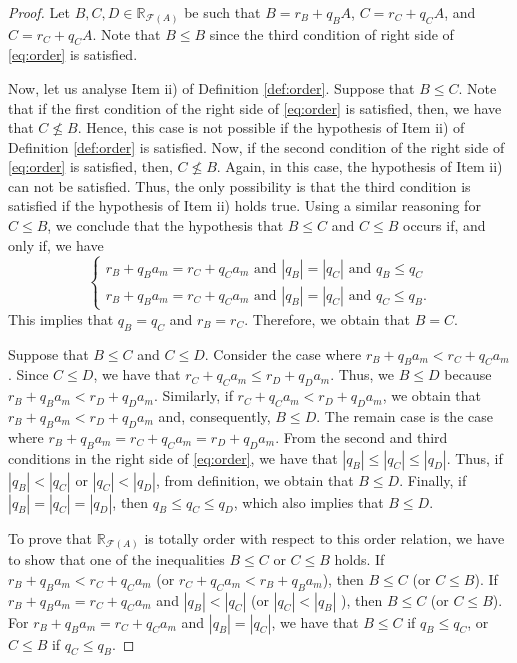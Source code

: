 \documentclass[12pt,a4paper]{article}
\newcommand{\RFA}{\mathbb{R}_{\mathcal{F}(A)}}
\begin{document}
\begin{proof}
Let $B,C,D \in \RFA$ be such that $B = r_B + q_BA$, $C = r_C + q_CA$, and $C = r_C + q_CA$. 
Note that $B \leq B$ since the third condition of right side of \eqref{eq:order} is satisfied. 

Now, let us analyse Item ii) of Definition \ref{def:order}. 
Suppose that  $B\leq C$. Note that if  the first condition of the right side of \eqref{eq:order} is satisfied, then, we have that $C \not\leq B$. Hence, this case is not possible if the hypothesis of Item ii) of Definition \ref{def:order} is satisfied. Now, if the second condition of the right side of \eqref{eq:order} is satisfied, then, $C \not\leq B$. Again, in this case, the hypothesis of Item ii) can not be satisfied. 
Thus, the only possibility is that the third condition is satisfied if the hypothesis of Item ii) holds true. 
Using a similar reasoning for $C \leq B$, we conclude that 
the hypothesis that $B\leq C$ and $C \leq B$ occurs if, and only if, we have 
\[
\left\lbrace\begin{array}{c}
r_B + q_Ba_m = r_C + q_Ca_m  \mbox{ and }  |q_B| = |q_C|   \mbox{ and }  q_B \leq q_C  \\
r_B + q_Ba_m = r_C + q_Ca_m  \mbox{ and }  |q_B| = |q_C|   \mbox{ and }  q_C \leq q_B. 
\end{array}\right.
\]
This implies that $q_B = q_C$ and $r_B = r_C$. Therefore, we obtain that $B = C$.

Suppose that $B \leq C$ and $C \leq D$. 
Consider the case where $r_B + q_Ba_m < r_C + q_Ca_m$. Since $C \leq D$, we have that 
$r_C + q_Ca_m \leq r_D + q_Da_m$. Thus, we $B\leq D$ because $r_B + q_Ba_m < r_D + q_Da_m$.
Similarly, if $r_C + q_Ca_m < r_D + q_Da_m$, we obtain that $r_B + q_Ba_m < r_D + q_Da_m$ and, consequently, 
$B\leq D$. 
The remain case is the case where  
$r_B + q_Ba_m = r_C + q_Ca_m = r_D + q_Da_m$. From the second and third conditions in 
the right side of \eqref{eq:order}, we have that $|q_B| \leq |q_C| \leq |q_D|$.
Thus, if $|q_B| < |q_C|$ or $|q_C| < |q_D|$, from definition, we obtain that $B\leq D$. 
Finally, if $|q_B| = |q_C| = |q_D|$, then $q_B \leq q_C  \leq q_D$, which also implies that 
$B\leq D$. 

To prove that $\RFA$ is totally order with respect to this order relation, we have to show that one of the inequalities $B\leq C$ or $C \leq B$ holds. 
If $r_B + q_Ba_m < r_C + q_Ca_m$ (or $r_C + q_Ca_m < r_B + q_Ba_m$), then $B\leq C$ (or $C \leq B$).  
If $r_B + q_Ba_m = r_C + q_Ca_m$ and $|q_B| < |q_C|$ (or $|q_C| < |q_B|$ ), then $B\leq C$ (or $C \leq B$). 
For $r_B + q_Ba_m = r_C + q_Ca_m$ and $|q_B| = |q_C|$, we have that $B\leq C$ if $q_B \leq q_C$, or  
$C \leq B$ if $q_C \leq q_B$.
\end{proof}
\end{document}
